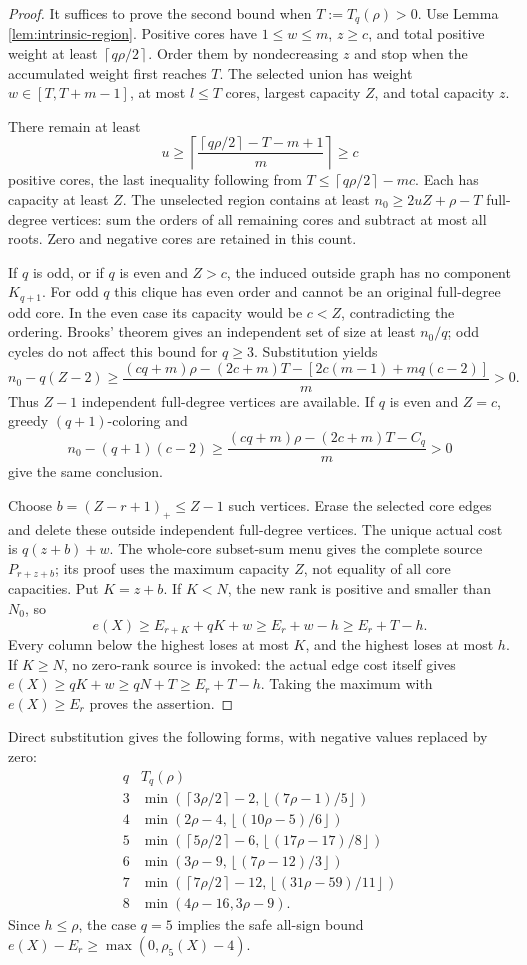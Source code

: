 \documentclass[11pt,a4paper]{article}
\newcommand{\floor}[1]{\left\lfloor#1\right\rfloor}
\newcommand{\ceil}[1]{\left\lceil#1\right\rceil}
\theoremstyle{definition}
\begin{document}
\begin{proof}
It suffices to prove the second bound when $T:=T_q(\rho)>0$. Use Lemma \ref{lem:intrinsic-region}. Positive cores have $1\le w\le m$, $z\ge c$, and total positive weight at least $\ceil{q\rho/2}$. Order them by nondecreasing $z$ and stop when the accumulated weight first reaches $T$. The selected union has weight $w\in[T,T+m-1]$, at most $l\le T$ cores, largest capacity $Z$, and total capacity $z$.

There remain at least
\[
 u\ge\ceil{\frac{\ceil{q\rho/2}-T-m+1}{m}}\ge c
\]
positive cores, the last inequality following from $T\le\ceil{q\rho/2}-mc$. Each has capacity at least $Z$. The unselected region contains at least $n_0\ge2uZ+\rho-T$ full-degree vertices: sum the orders of all remaining cores and subtract at most all roots. Zero and negative cores are retained in this count.

If $q$ is odd, or if $q$ is even and $Z>c$, the induced outside graph has no component $K_{q+1}$. For odd $q$ this clique has even order and cannot be an original full-degree odd core. In the even case its capacity would be $c<Z$, contradicting the ordering. Brooks' theorem \cite{brooks} gives an independent set of size at least $n_0/q$; odd cycles do not affect this bound for $q\ge3$. Substitution yields
\[
 n_0-q(Z-2)\ge
 \frac{(cq+m)\rho-(2c+m)T-[2c(m-1)+mq(c-2)]}{m}>0.
\]
Thus $Z-1$ independent full-degree vertices are available. If $q$ is even and $Z=c$, greedy $(q+1)$-coloring and
\[
 n_0-(q+1)(c-2)\ge
 \frac{(cq+m)\rho-(2c+m)T-C_q}{m}>0
\]
give the same conclusion.

Choose $b=(Z-r+1)_+\le Z-1$ such vertices. Erase the selected core edges and delete these outside independent full-degree vertices. The unique actual cost is $q(z+b)+w$. The whole-core subset-sum menu gives the complete source $P_{r+z+b}$; its proof uses the maximum capacity $Z$, not equality of all core capacities. Put $K=z+b$. If $K<N$, the new rank is positive and smaller than $N_0$, so
\[
e(X)\ge E_{r+K}+qK+w\ge E_r+w-h\ge E_r+T-h.
\]
Every column below the highest loses at most $K$, and the highest loses at most $h$. If $K\ge N$, no zero-rank source is invoked: the actual edge cost itself gives $e(X)\ge qK+w\ge qN+T\ge E_r+T-h$. Taking the maximum with $e(X)\ge E_r$ proves the assertion.
\end{proof}

Direct substitution gives the following forms, with negative values replaced by zero:
\[
\begin{array}{c|l}
q&T_q(\rho)\\\hline
3&\min(\ceil{3\rho/2}-2,\floor{(7\rho-1)/5})\\
4&\min(2\rho-4,\floor{(10\rho-5)/6})\\
5&\min(\ceil{5\rho/2}-6,\floor{(17\rho-17)/8})\\
6&\min(3\rho-9,\floor{(7\rho-12)/3})\\
7&\min(\ceil{7\rho/2}-12,\floor{(31\rho-59)/11})\\
8&\min(4\rho-16,3\rho-9).
\end{array}
\]
Since $h\le\rho$, the case $q=5$ implies the safe all-sign bound
$e(X)-E_r\ge\max(0,\rho_5(X)-4)$.
\end{document}
